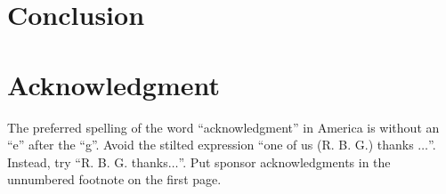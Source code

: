 \documentclass[conference]{IEEEtran}
\begin{document}
\section{Conclusion}








\section*{Acknowledgment}

The preferred spelling of the word ``acknowledgment'' in America is without 
an ``e'' after the ``g''. Avoid the stilted expression ``one of us (R. B. 
G.) thanks $\ldots$''. Instead, try ``R. B. G. thanks$\ldots$''. Put sponsor 
acknowledgments in the unnumbered footnote on the first page. \\
\end{document}
